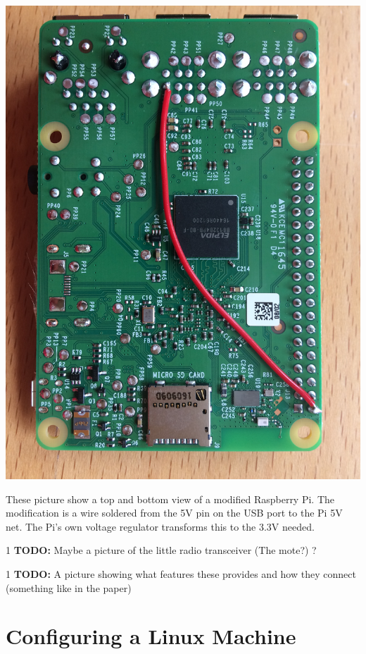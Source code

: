 \documentclass[12pt]{article} %
\def\printtodos{0}
\newcommand{\todo}[1]{
  \if\printtodos1
      {\color{red} \textbf{TODO:} #1}
  \fi}
\begin{document}
\begin{minipage}{0.33\textwidth}
  \noindent \includegraphics[width=\textwidth]{./photos/Pi2.JPG}
\end{minipage}
\begin{minipage}{0.66\textwidth} %
  These picture show a top and bottom view of a modified Raspberry
  Pi. The modification is a wire soldered from the 5V pin on the USB
  port to the Pi 5V net. The Pi's own voltage regulator transforms
  this to the 3.3V needed.
\end{minipage}

\todo{Maybe a picture of the little radio transceiver (The mote?) ?}

\todo{A picture showing what features these provides and how they
  connect (something like in the paper)}


\section{Configuring a Linux Machine}
\end{document}
